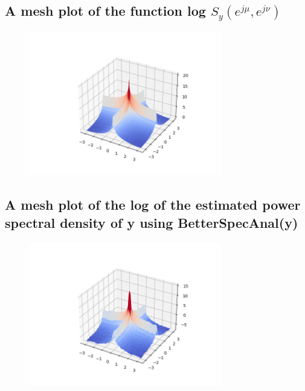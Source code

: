 \documentclass{article}
\begin{document}
\subsection{A mesh plot of the function log $S_y(e^{j\mu}, e^{j\nu})$}
\begin{figure}[H]
    \centering
    \includegraphics[width=0.75\textwidth]{../images/y-log-pwr-spec-density-theoretical.png}
    \begin{center}
    \end{center}
\end{figure}
\subsection{A mesh plot of the log of the estimated power spectral density of y using BetterSpecAnal(y)}
\begin{figure}[H]
    \centering
    \includegraphics[width=0.75\textwidth]{../images/y-log-pwr-spec-density-better.png}
    \begin{center}
    \end{center}
\end{figure}
\end{document}
